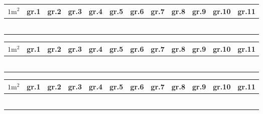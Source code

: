 \newpage
\large
\thispagestyle{empty}
\begin{center}
	\begin{tabular}{|p{0.7cm}|p{0.7cm}|p{0.7cm}|p{0.7cm}|p{0.7cm}|p{0.7cm}|p{0.7cm}|p{0.7cm}|p{0.7cm}|p{0.7cm}|p{0.7cm}|p{0.7cm}|}
		\hline
		$ 1\textrm{m}^2 $ & gr.1& gr.2 & gr.3 & gr.4 & gr.5 & gr.6 & gr.7 & gr.8 & gr.9 & gr.10 & gr.11  \\ \hline
		&&&&&&&&&&& \\
		&&&&&&&&&&& \\
		&&&&&&&&&&& \\
		&&&&&&&&&&& \\\hline
		&&&&&&&&&&& \\
		&&&&&&&&&&& \\\hline
	\end{tabular}
\end{center} \vspace{10pt}

\begin{center}
	\begin{tabular}{|p{0.7cm}|p{0.7cm}|p{0.7cm}|p{0.7cm}|p{0.7cm}|p{0.7cm}|p{0.7cm}|p{0.7cm}|p{0.7cm}|p{0.7cm}|p{0.7cm}|p{0.7cm}|}
		\hline
		$ 1\textrm{m}^2 $ & gr.1& gr.2 & gr.3 & gr.4 & gr.5 & gr.6 & gr.7 & gr.8 & gr.9 & gr.10 & gr.11  \\ \hline
		&&&&&&&&&&& \\
		&&&&&&&&&&& \\
		&&&&&&&&&&& \\
		&&&&&&&&&&& \\\hline
		&&&&&&&&&&& \\
		&&&&&&&&&&& \\\hline
	\end{tabular}
\end{center}

\vspace{10pt}

\begin{center}
	\begin{tabular}{|p{0.7cm}|p{0.7cm}|p{0.7cm}|p{0.7cm}|p{0.7cm}|p{0.7cm}|p{0.7cm}|p{0.7cm}|p{0.7cm}|p{0.7cm}|p{0.7cm}|p{0.7cm}|}
		\hline
		$ 1\textrm{m}^2 $ & gr.1& gr.2 & gr.3 & gr.4 & gr.5 & gr.6 & gr.7 & gr.8 & gr.9 & gr.10 & gr.11  \\ \hline
		&&&&&&&&&&& \\
		&&&&&&&&&&& \\
		&&&&&&&&&&& \\
		&&&&&&&&&&& \\\hline
		&&&&&&&&&&& \\
		&&&&&&&&&&& \\\hline
	\end{tabular}
\end{center}
\vspace{10pt}

